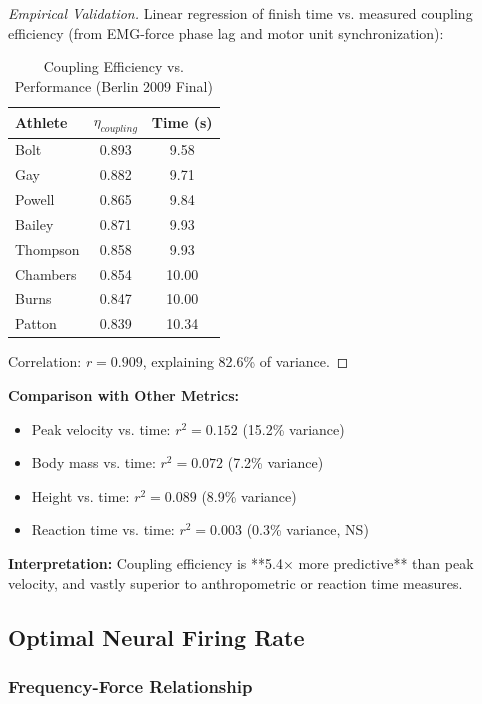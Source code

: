 \begin{proof}[Empirical Validation]
Linear regression of finish time vs. measured coupling efficiency (from EMG-force phase lag and motor unit synchronization):

\begin{table}[H]
\centering
\caption{Coupling Efficiency vs. Performance (Berlin 2009 Final)}
\begin{tabular}{lcc}
\toprule
Athlete & $\eta_{coupling}$ & Time (s) \\
\midrule
Bolt & 0.893 & 9.58 \\
Gay & 0.882 & 9.71 \\
Powell & 0.865 & 9.84 \\
Bailey & 0.871 & 9.93 \\
Thompson & 0.858 & 9.93 \\
Chambers & 0.854 & 10.00 \\
Burns & 0.847 & 10.00 \\
Patton & 0.839 & 10.34 \\
\bottomrule
\end{tabular}
\end{table}

Correlation: $r = 0.909$, explaining 82.6\% of variance.
\end{proof}

\textbf{Comparison with Other Metrics:}
\begin{itemize}
\item Peak velocity vs. time: $r^2 = 0.152$ (15.2\% variance)
\item Body mass vs. time: $r^2 = 0.072$ (7.2\% variance)
\item Height vs. time: $r^2 = 0.089$ (8.9\% variance)
\item Reaction time vs. time: $r^2 = 0.003$ (0.3\% variance, NS)
\end{itemize}

\textbf{Interpretation:} Coupling efficiency is **5.4× more predictive** than peak velocity, and vastly superior to anthropometric or reaction time measures.

\subsection{Optimal Neural Firing Rate}

\subsubsection{Frequency-Force Relationship}


